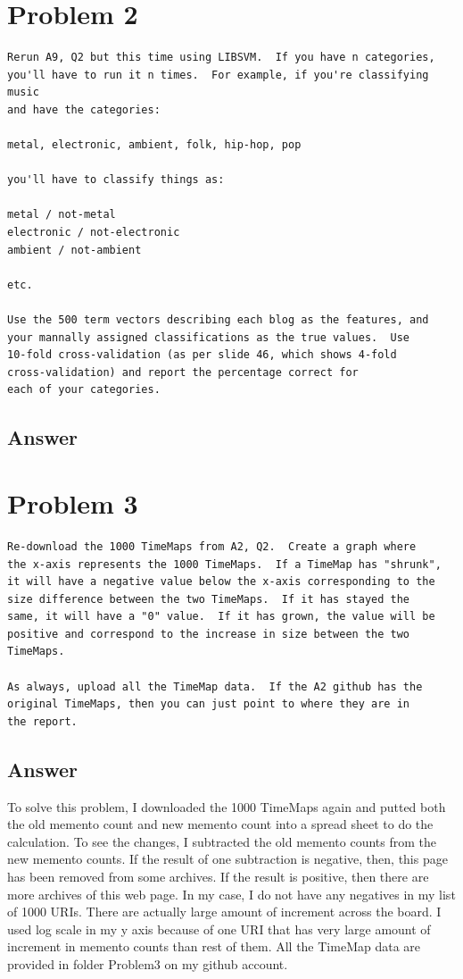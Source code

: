 \documentclass[12pt]{article}
\begin{document}


\section*{Problem 2}

\begin{verbatim}
Rerun A9, Q2 but this time using LIBSVM.  If you have n categories,
you'll have to run it n times.  For example, if you're classifying music
and have the categories:

metal, electronic, ambient, folk, hip-hop, pop

you'll have to classify things as:

metal / not-metal
electronic / not-electronic
ambient / not-ambient

etc.

Use the 500 term vectors describing each blog as the features, and
your mannally assigned classifications as the true values.  Use
10-fold cross-validation (as per slide 46, which shows 4-fold
cross-validation) and report the percentage correct for 
each of your categories.
\end{verbatim}

\subsection*{Answer}

\section*{Problem 3}
\begin{verbatim}
Re-download the 1000 TimeMaps from A2, Q2.  Create a graph where
the x-axis represents the 1000 TimeMaps.  If a TimeMap has "shrunk",
it will have a negative value below the x-axis corresponding to the
size difference between the two TimeMaps.  If it has stayed the
same, it will have a "0" value.  If it has grown, the value will be 
positive and correspond to the increase in size between the two
TimeMaps.

As always, upload all the TimeMap data.  If the A2 github has the 
original TimeMaps, then you can just point to where they are in 
the report.
\end{verbatim}
\subsection*{Answer}
To solve this problem, I downloaded the 1000 TimeMaps again and putted both the old memento count and new memento count into a spread sheet to do the calculation. To see the changes, I subtracted the old memento counts from the new memento counts. If the result of one subtraction is negative, then, this page has been removed from some archives. If the result is positive, then there are more archives of this web page. In my case, I do not have any negatives in my list of 1000 URIs. There are actually large amount of increment across the board. I used log scale in my y axis because of one URI that has very large amount of increment in memento counts than rest of them. All the TimeMap data are provided in folder Problem3 on my github account.
\end{document}
